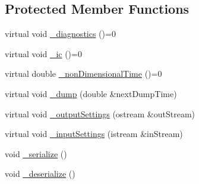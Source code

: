 \subsection*{Protected Member Functions}
\begin{DoxyCompactItemize}
\item 
virtual void \hyperlink{class_simulation___fluid_a6757a185fee17eeedf920c2bf8da2e44}{\+\_\+diagnostics} ()=0
\item 
virtual void \hyperlink{class_simulation___fluid_a98cc2ccad2d48a5ac38cb52d4c18824a}{\+\_\+ic} ()=0
\item 
virtual double \hyperlink{class_simulation___fluid_acc8ed78a2caec36b0591a8a7070a5c53}{\+\_\+non\+Dimensional\+Time} ()=0
\item 
virtual void \hyperlink{class_simulation___fluid_ae087af2d2354bbf8ea6d60599ae1efbe}{\+\_\+dump} (double \&next\+Dump\+Time)
\item 
virtual void \hyperlink{class_simulation___fluid_a96614718a72ab760761ce281c74a6c64}{\+\_\+output\+Settings} (ostream \&out\+Stream)
\item 
virtual void \hyperlink{class_simulation___fluid_a5b0c5cf9f094714208ed5d925657bee2}{\+\_\+input\+Settings} (istream \&in\+Stream)
\item 
void \hyperlink{class_simulation___fluid_a5dc18dd19f39ac22c0bedd65e6fa619b}{\+\_\+serialize} ()
\item 
void \hyperlink{class_simulation___fluid_af2be46f3f47b0e2e2504684f92c7b3e6}{\+\_\+deserialize} ()
\end{DoxyCompactItemize}
